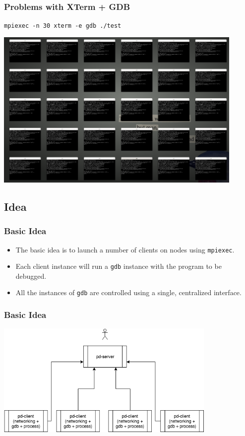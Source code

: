 \documentclass{beamer}
\begin{document}
\begin{frame}
  \frametitle{Problems with XTerm + GDB}
  \texttt{mpiexec -n 30 xterm -e gdb ./test}

  \begin{center}
    \includegraphics[width=0.9\textwidth]{usingxterm}
  \end{center}
\end{frame}


\subsection{Idea}
\begin{frame}
  \frametitle{Basic Idea}
\begin{itemize}
  \item <1-> The basic idea is to launch a number of clients on nodes using \texttt{mpiexec}.
  \item <2-> Each client instance will run a \texttt{gdb} instance with the program to be debugged.
  \item <3-> All the instances of \texttt{gdb} are controlled using a single, centralized interface.
\end{itemize}
\end{frame}

\begin{frame}
  \frametitle{Basic Idea}
  \begin{center}
   \includegraphics[width=0.8\textwidth]{flow}
  \end{center}
\end{frame}
\end{document}
